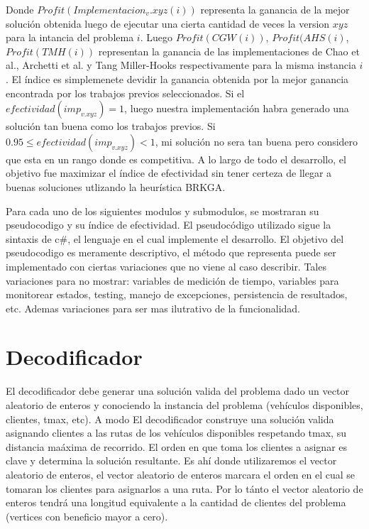 Donde $Profit(Implementacion_v.xyz(i))$ representa la ganancia de la mejor solución obtenida luego de ejecutar una cierta cantidad de veces la version $xyz$ para la intancia del problema $i$. Luego $Profit(CGW(i))$, $Profit(AHS(i)$, $Profit(TMH(i))$ representan la ganancia de las implementaciones de Chao et al., Archetti et al. y Tang Miller-Hooks respectivamente para la misma instancia $i$. El índice es simplemenete devidir la ganancia obtenida por la mejor ganancia encontrada por los trabajos previos seleccionados. Si el $efectividad(imp_{v.xyz}) = 1$, luego nuestra implementación habra generado una solución tan buena como los trabajos previos. Si $0.95 \leq efectividad(imp_{v.xyz}) < 1$, mi solución no sera tan buena pero considero que esta en un rango donde es  competitiva. A lo largo de todo el desarrollo, el objetivo fue maximizar el índice de efectividad sin tener certeza de llegar a buenas soluciones utlizando la heurística BRKGA.

\bigskip

Para cada uno de los siguientes modulos y submodulos, se mostraran su pseudocodigo y su índice de efectividad. El pseudocódigo utilizado sigue la sintaxis de c\#, el lenguaje en el cual implemente el desarrollo. El objetivo del pseudocodigo es meramente descriptivo, el método que representa puede ser implementado con ciertas variaciones que no viene al caso describir. Tales variaciones para no mostrar: variables de medición de tiempo, variables para monitorear estados, testing, manejo de excepciones, persistencia de resultados, etc. Ademas variaciones para ser mas ilutrativo de la funcionalidad. 

\section{Decodificador}

El decodificador debe generar una solución valida del problema dado un vector aleatorio de enteros y conociendo la instancia del problema (vehículos disponibles, clientes, tmax, etc). A modo El decodificador construye una solución valida asignando clientes a las rutas de los vehículos disponibles respetando tmax, su distancia maáxima de recorrido. El orden en que toma los clientes a asignar es clave y determina la solución resultante. Es ahí donde utilizaremos el vector aleatorio de enteros, el vector aleatorio de enteros marcara el orden en el cual se tomaran los clientes para asignarlos a una ruta. Por lo tánto el vector aleatorio de enteros tendrá una longitud equivalente a la cantidad de clientes del problema (vertices con beneficio mayor a cero).

